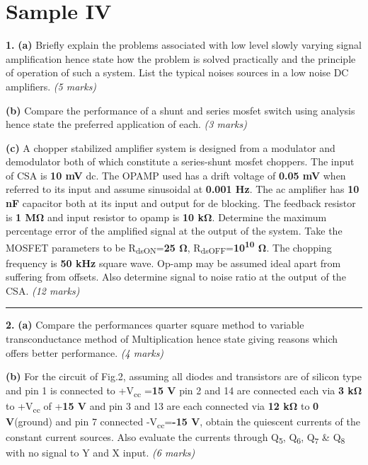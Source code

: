 \section*{Sample IV}
\textbf{1.} \textbf{(a)} Briefly explain the problems associated with low level slowly varying signal amplification hence state how the problem is solved practically and the principle of operation of such a system. List the typical noises sources in a low noise DC amplifiers.
\textit{(5 marks)}

\textbf{(b)} Compare the performance of a shunt and series mosfet switch using analysis hence state the preferred application of each.
\textit{(3 marks)}

\textbf{(c)} A chopper stabilized amplifier system is designed from a modulator and demodulator both of which constitute a series-shunt mosfet choppers. The input of CSA is \textbf{10 mV} dc. The OPAMP used has a drift voltage of \textbf{0.05 mV} when referred to its input and assume sinusoidal at \textbf{0.001 Hz}. The ac amplifier has \textbf{10 nF} capacitor both at its input and output for de blocking. The feedback resistor is \textbf{1 MΩ} and input resistor to opamp is \textbf{10 kΩ}. Determine the maximum percentage error of the amplified signal at the output of the system. Take the MOSFET parameters to be R\textsubscript{dsON}=\textbf{25 Ω}, R\textsubscript{dsOFF}=\textbf{10\textsuperscript{10} Ω}. The chopping frequency is \textbf{50 kHz} square wave. Op-amp may be assumed ideal apart from suffering from offsets. Also determine signal to noise ratio at the output of the CSA.
\textit{(12 marks)}

\begin{center}\rule{0.5\linewidth}{0.5pt}\end{center}

\textbf{2.} \textbf{(a)} Compare the performances quarter square method to variable transconductance method of Multiplication hence state giving reasons which offers better performance.
\textit{(4 marks)}

\textbf{(b)} For the circuit of Fig.2, assuming all diodes and transistors are of silicon type and pin 1 is connected to +V\textsubscript{cc} =\textbf{15 V} pin 2 and 14 are connected each via \textbf{3 kΩ} to +V\textsubscript{cc} of +\textbf{15 V} and pin 3 and 13 are each connected via \textbf{12 kΩ} to \textbf{0 V}(ground) and pin 7 connected -V\textsubscript{cc}=\textbf{-15 V}, obtain the quiescent currents of the constant current sources. Also evaluate the currents through Q\textsubscript{5}, Q\textsubscript{6}, Q\textsubscript{7} \& Q\textsubscript{8} with no signal to Y and X input.
\textit{(6 marks)}

